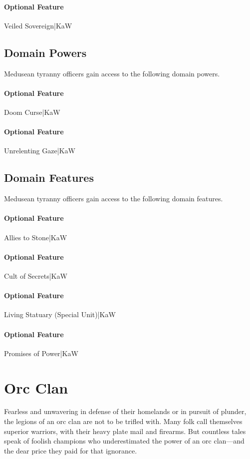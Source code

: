 \documentclass[10pt,a4paper,twoside,bg=print,twocolumn,openany,nodeprecatedcode]{dndbook}
\begin{document}
\paragraph{Optional Feature}
Veiled Sovereign|KaW

\subsection{Domain Powers}
Medusean tyranny officers gain access to the following domain powers.

\paragraph{Optional Feature}
Doom Curse|KaW

\paragraph{Optional Feature}
Unrelenting Gaze|KaW

\subsection{Domain Features}
Medusean tyranny officers gain access to the following domain features.

\paragraph{Optional Feature}
Allies to Stone|KaW

\paragraph{Optional Feature}
Cult of Secrets|KaW

\paragraph{Optional Feature}
Living Statuary (Special Unit)|KaW

\paragraph{Optional Feature}
Promises of Power|KaW

\section{Orc Clan}
Fearless and unwavering in defense of their homelands or in pursuit of plunder, the legions of an orc clan are not to be trifled with. Many folk call themselves superior warriors, with their heavy plate mail and firearms. But countless tales speak of foolish champions who underestimated the power of an orc clan—and the dear price they paid for that ignorance.
\end{document}
